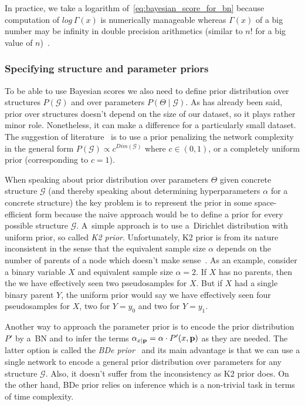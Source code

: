 \documentclass[english,cover]{fitthesis} %
\newcommand{\term}[1]{\emph{#1}}           %
\newcommand{\vars}[1]{{\bold{#1}}}         %
\begin{document}
\medskip

In practice, we take a logarithm of~\eqref{eq:bayesian_score_for_bn} because computation of $log \, \Gamma(x)$ is numerically manageable whereas $\Gamma(x)$ of a big number may be infinity in double precision arithmetics (similar to $n!$ for a big value of $n$)~\cite[p.~801]{pgm}.


\subsubsection{Specifying structure and parameter priors}
To be able to use Bayesian scores we also need to define prior distribution over structures $P(\mathcal{G})$ and over parameters $P(\Theta \mid \mathcal{G})$. As has already been said, prior over structures doesn't depend on the size of our dataset, so it plays rather minor role. Nonetheless, it can make a difference for a particularly small dataset. The suggestion of literature~\cite[p.~804]{pgm} is to use a prior penalizing the network complexity in the general form $P(\mathcal{G}) \propto c^{Dim(\mathcal{G})}$ where $c \in (0, 1)$, or a completely uniform prior (corresponding to $c = 1$).

When speaking about prior distribution over parameters $\Theta$ given concrete structure $\mathcal{G}$ (and thereby speaking about determining hyperparameters $\alpha$ for a concrete structure) the key problem is to represent the prior in some space-efficient form because the naive approach would be to define a prior for every possible structure $\mathcal{G}$. A~simple approach is to use a~Dirichlet distribution with uniform prior, so called \term{K2 prior}. Unfortunately, K2 prior is from its nature inconsistent in the sense that the equivalent sample size $\alpha$ depends on the number of parents of a node which doesn't make sense~\cite[p.~806]{pgm}. As an example, consider a binary variable $X$ and equivalent sample size $\alpha=2$. If $X$ has no parents, then the we have effectively seen two pseudosamples for $X$. But if $X$ had a single binary parent $Y$, the uniform prior would say we have effectively seen four pseudosamples for $X$, two for $Y = y_0$ and two for $Y = y_1$.

Another way to approach the parameter prior is to encode the prior distribution $P'$ by a~BN and to infer the terms $\alpha_{x \mid \vars{p}} = \alpha \cdot P'(x, \vars{p})$ as they are needed. The latter option is called the \term{BDe prior}~\cite[p.~806]{pgm} and its main advantage is that we can use a single network to encode a general prior distribution over parameters for any structure $\mathcal{G}$. Also, it doesn't suffer from the inconsistency as K2 prior does. On the other hand, BDe prior relies on inference which is a non-trivial task in terms of time complexity.
\end{document}

